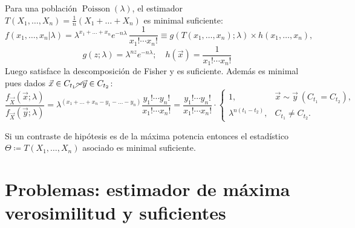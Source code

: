 \begin{ejemplo}
Para una población $\operatorname{Poisson}(\lambda)$, el estimador $T(X_1, \dots, X_n) = \frac{1}{n}(X_1 + \dots + X_n)$ es minimal suficiente:
\[
  f(x_1, \dots, x_n|\lambda) = \lambda^{x_1 + \dots + x_n} e^{-n\lambda}\,  \frac{1}{x_1!\cdots x_n!} \equiv g(T(x_1, \dots, x_n);\lambda) \times h(x_1, \dots, x_n),
\]
$$g(z;\lambda) = \lambda^{nz} e^{-n\lambda}; \quad h(\vec{x}) = \frac{1}{x_1!\cdots x_n!}$$
Luego satisface la descomposición de Fisher y es suficiente. Además es minimal pues dados $\vec{x} \in C_{t_1} \cancel{\sim} \vec{y} \in C_{t_2}$:
\[
  \frac{f_{\vec{X}}(\vec{x};\lambda)}{f_{\vec{X}}(\vec{y};\lambda)} = \lambda^{(x_1 + \dots + x_n - y_1 - \dots - y_n)}\frac{y_1!\cdots y_n!}{x_1!\cdots x_n!} = \frac{y_1!\cdots y_n!}{x_1!\cdots x_n!} \cdot
  \begin{cases}
    1, & \vec{x} \sim \vec{y}\ (C_{t_1} = C_{t_2}), \\
    \lambda^{n(t_1 - t_2)}, & C_{t_1} \neq C_{t_2}.
  \end{cases}
\]
\end{ejemplo}
\textcolor{azulresalt}{
\begin{proposicion}[10]
Si un contraste de hipótesis es de la máxima potencia entonces el estadístico $\Theta \coloneqq T(X_1, \dots, X_n)$ asociado es minimal suficiente.
\end{proposicion}}

\section{Problemas: estimador de máxima verosimilitud y suficientes}

